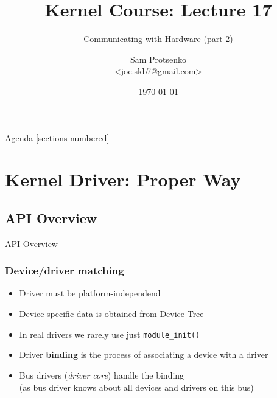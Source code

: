 

\title{Kernel Course: Lecture 17}
\subtitle{Communicating with Hardware (part 2)}
\author{Sam Protsenko \texorpdfstring{\\ <joe.skb7@gmail.com>}{}}
\date{\vspace*{5mm}\today}




\maketitle

\begin{frame}{Agenda}
  [sections numbered]
  \tableofcontents[hideallsubsections]
\end{frame}

\section{Kernel Driver: Proper Way}

\subsection{API Overview}

\begin{frame}[standout]
  API Overview
\end{frame}

\begin{frame}
  \frametitle{Device/driver matching}
  \begin{itemize}
    \item Driver must be platform-independend
    \item Device-specific data is obtained from Device Tree
    \item In real drivers we rarely use just \texttt{module\_init()}
    \item Driver \textbf{binding} is the process of associating a device with
          a driver
    \item Bus drivers (\textit{driver core}) handle the binding \\
          (as bus driver knows about all devices and drivers on this bus)
  \end{itemize}
\end{frame}

